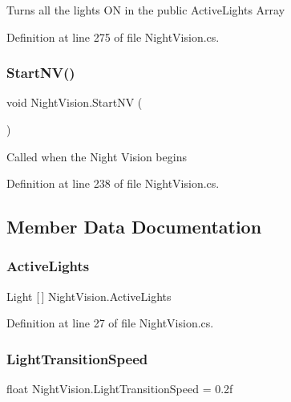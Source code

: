 Turns all the lights ON in the public Active\+Lights Array 



Definition at line 275 of file Night\+Vision.\+cs.

\mbox{\label{class_night_vision_af4355043a822669cf20c1bc318543539}} 
\subsubsection{\texorpdfstring{Start\+N\+V()}{StartNV()}}
{\footnotesize\ttfamily void Night\+Vision.\+Start\+NV (\begin{DoxyParamCaption}{ }\end{DoxyParamCaption})}



Called when the Night Vision begins 



Definition at line 238 of file Night\+Vision.\+cs.



\subsection{Member Data Documentation}
\mbox{\label{class_night_vision_a66c2ee9ee95d47cd713ddddc3d901e53}} 
\subsubsection{\texorpdfstring{Active\+Lights}{ActiveLights}}
{\footnotesize\ttfamily Light \mbox{[}$\,$\mbox{]} Night\+Vision.\+Active\+Lights}



Definition at line 27 of file Night\+Vision.\+cs.

\mbox{\label{class_night_vision_a7a289fb3043fbb063347fff73db3f9fc}} 
\subsubsection{\texorpdfstring{Light\+Transition\+Speed}{LightTransitionSpeed}}
{\footnotesize\ttfamily float Night\+Vision.\+Light\+Transition\+Speed = 0.\+2f}



